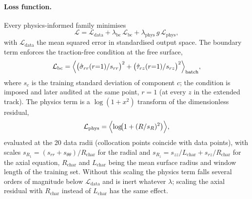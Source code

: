 \documentclass[subscriptcorrection,upint,varvw,barcolor=Goldenrod3,mathalfa=cal=euler,balance,hyphenate,french,pdf-a]{asmejour} %
\begin{document}
\paragraph{Loss function.}
Every physics-informed family minimises
\begin{equation}
  \mathcal{L} = \mathcal{L}_{\mathrm{data}}
              + \lambda_{\mathrm{bc}}\,\mathcal{L}_{\mathrm{bc}}
              + \lambda_{\mathrm{phys}}\,g\,\mathcal{L}_{\mathrm{phys}},
  \label{eq:loss}
\end{equation}
with $\mathcal{L}_{\mathrm{data}}$ the mean squared error in standardised output
space. The boundary term enforces the traction-free condition at the free
surface,
\begin{equation}
  \mathcal{L}_{\mathrm{bc}} = \Bigl\langle
     \bigl(\hat\sigma_{rr}(r{=}1)/s_{rr}\bigr)^2
   + \bigl(\hat\tau_{rz}(r{=}1)/s_{rz}\bigr)^2 \Bigr\rangle_{\mathrm{batch}},
  \label{eq:lbc}
\end{equation}
where $s_c$ is the training standard deviation of component $c$; the condition is
imposed and later audited at the same point, $r=1$ (at every $z$ in the extended
track). The physics term is a $\log(1+x^2)$ transform of the dimensionless
residual,
\begin{equation}
  \mathcal{L}_{\mathrm{phys}} = \Bigl\langle \log\!\bigl(1 + (R/s_R)^2\bigr) \Bigr\rangle,
  \label{eq:lphys}
\end{equation}
evaluated at the 20 data radii (collocation points coincide with data points),
with scales $s_{R_1}=(s_{rr}+s_{\theta\theta})/R_{\mathrm{char}}$ for the radial and
$s_{R_z}=s_{zz}/L_{\mathrm{char}}+s_{rz}/R_{\mathrm{char}}$ for the axial equation,
$R_{\mathrm{char}}$ and $L_{\mathrm{char}}$ being the mean surface radius and window
length of the training set.
Without this scaling the physics term falls several orders of magnitude below
$\mathcal{L}_{\mathrm{data}}$ and is inert whatever $\lambda$; scaling the axial
residual with $R_{\mathrm{char}}$ instead of $L_{\mathrm{char}}$ has the same effect.
\end{document}
